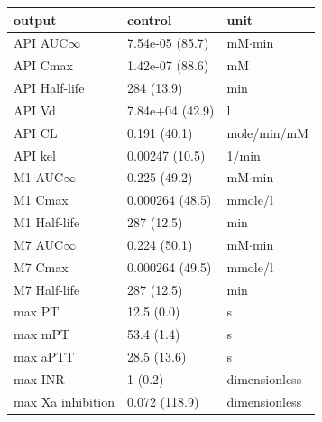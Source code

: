 \begin{tabular}{lll}
\toprule
output & control & unit \\
\midrule
API AUC$\infty$ & 7.54e-05 (85.7) & mM$\cdot$min \\
API Cmax & 1.42e-07 (88.6) & mM \\
API Half-life & 284 (13.9) & min \\
API Vd & 7.84e+04 (42.9) & l \\
API CL & 0.191 (40.1) & mole/min/mM \\
API kel & 0.00247 (10.5) & 1/min \\
M1 AUC$\infty$ & 0.225 (49.2) & mM$\cdot$min \\
M1 Cmax & 0.000264 (48.5) & mmole/l \\
M1 Half-life & 287 (12.5) & min \\
M7 AUC$\infty$ & 0.224 (50.1) & mM$\cdot$min \\
M7 Cmax & 0.000264 (49.5) & mmole/l \\
M7 Half-life & 287 (12.5) & min \\
max PT & 12.5 (0.0) & s \\
max mPT & 53.4 (1.4) & s \\
max aPTT & 28.5 (13.6) & s \\
max INR & 1 (0.2) & dimensionless \\
max Xa inhibition & 0.072 (118.9) & dimensionless \\
\bottomrule
\end{tabular}
